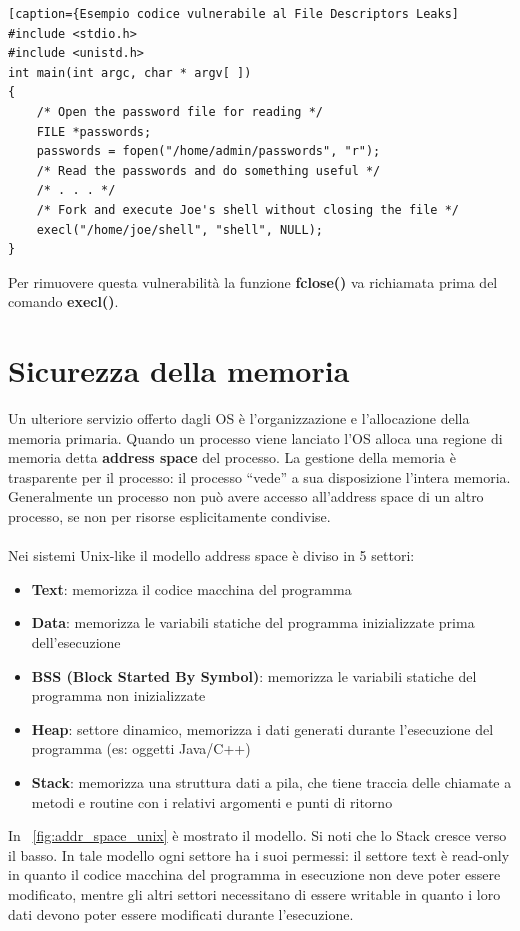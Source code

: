 \begin{algorithm}
\begin{lstlisting}
[caption={Esempio codice vulnerabile al File Descriptors Leaks]
#include <stdio.h>
#include <unistd.h>
int main(int argc, char * argv[ ])
{
	/* Open the password file for reading */
	FILE *passwords;
	passwords = fopen("/home/admin/passwords", "r");
	/* Read the passwords and do something useful */
	/* . . . */
	/* Fork and execute Joe's shell without closing the file */
	execl("/home/joe/shell", "shell", NULL);
}
\end{lstlisting}
\end{algorithm}
Per rimuovere questa vulnerabilità la funzione \textbf{fclose()} va richiamata prima del comando \textbf{execl()}.

\section{Sicurezza della memoria}
Un ulteriore servizio offerto dagli OS è l'organizzazione e l'allocazione della memoria primaria. Quando un processo viene lanciato l'OS alloca una regione di memoria detta \textbf{address space} del processo. La gestione della memoria è trasparente per il processo: il processo “vede” a sua disposizione l'intera memoria. Generalmente un processo non può avere accesso all'address space di un altro processo, se non per risorse esplicitamente condivise. \\ \\
Nei sistemi Unix-like il modello address space è diviso in 5 settori:
\begin{itemize}
  \item \textbf{Text}: memorizza il codice macchina del programma
  \item \textbf{Data}: memorizza le variabili statiche del programma inizializzate prima dell'esecuzione
  \item	\textbf{BSS (Block Started By Symbol)}: memorizza le variabili statiche del programma non inizializzate
  \item	\textbf{Heap}: settore dinamico, memorizza i dati generati durante l'esecuzione del programma (es: oggetti Java/C++) 
  \item	\textbf{Stack}: memorizza una struttura dati a pila, che tiene traccia delle chiamate a metodi e routine con i relativi argomenti e punti di ritorno 
\end{itemize}
In \figurename~\ref{fig:addr_space_unix} è mostrato il modello. Si noti che lo Stack cresce verso il basso. In tale modello ogni settore ha i suoi permessi: il settore text è read-only in quanto il codice macchina del programma in esecuzione non deve poter essere modificato, mentre gli altri settori necessitano di essere writable in quanto i loro dati devono poter essere modificati durante l'esecuzione.
